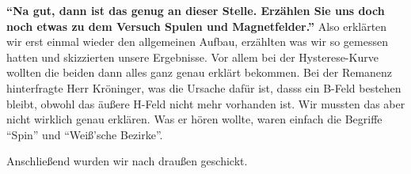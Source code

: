 \noindent \textbf{\enquote{Na gut, dann ist das genug an dieser Stelle. Erzählen Sie uns doch noch etwas zu dem Versuch Spulen und Magnetfelder.}} 
Also erklärten wir erst einmal wieder den allgemeinen Aufbau, erzählten was wir so gemessen hatten und skizzierten unsere Ergebnisse. 
Vor allem bei der Hysterese-Kurve wollten die beiden dann alles ganz genau erklärt bekommen. Bei der Remanenz hinterfragte Herr Kröninger, 
was die Ursache dafür ist, dasss ein B-Feld bestehen bleibt, obwohl das äußere H-Feld nicht mehr vorhanden ist. Wir mussten das aber nicht wirklich 
genau erklären. Was er hören wollte, waren einfach die Begriffe \enquote{Spin} und \enquote{Weiß'sche Bezirke}.

\noindent Anschließend wurden wir nach draußen geschickt.

